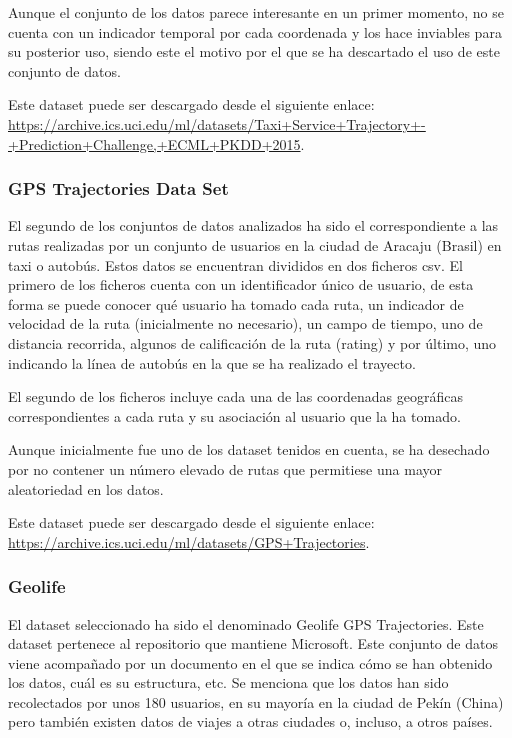 Aunque el conjunto de los datos parece interesante en un primer momento, no se cuenta con un indicador temporal por cada coordenada y los hace inviables para su posterior uso, siendo este el motivo por el que se ha descartado el uso de este conjunto de datos.

Este dataset puede ser descargado desde el siguiente enlace: \url{https://archive.ics.uci.edu/ml/datasets/Taxi+Service+Trajectory+-+Prediction+Challenge,+ECML+PKDD+2015}.

\subsubsection{GPS Trajectories Data Set}
El segundo de los conjuntos de datos analizados ha sido el correspondiente a las rutas realizadas por un conjunto de usuarios en la ciudad de Aracaju (Brasil) en taxi o autobús. Estos datos se encuentran divididos en dos ficheros csv. El primero de los ficheros cuenta con un identificador único de usuario, de esta forma se puede conocer qué usuario ha tomado cada ruta, un indicador de velocidad de la ruta (inicialmente no necesario), un campo de tiempo, uno de distancia recorrida, algunos de calificación de la ruta (rating) y por último, uno indicando la línea de autobús en la que se ha realizado el trayecto.

El segundo de los ficheros incluye cada una de las coordenadas geográficas correspondientes a cada ruta y su asociación al usuario que la ha tomado.

Aunque inicialmente fue uno de los dataset tenidos en cuenta, se ha desechado por no contener un número elevado de rutas que permitiese una mayor aleatoriedad en los datos.

Este dataset puede ser descargado desde el siguiente enlace: \url{https://archive.ics.uci.edu/ml/datasets/GPS+Trajectories}.

\subsubsection{Geolife}
El dataset seleccionado ha sido el denominado Geolife GPS Trajectories. Este dataset pertenece al repositorio que mantiene Microsoft. Este conjunto de datos viene acompañado por un documento en el que se indica cómo se han obtenido los datos, cuál es su estructura, etc. Se menciona que los datos han sido recolectados por unos 180 usuarios, en su mayoría en la ciudad de Pekín (China) pero también existen datos de viajes a otras ciudades o, incluso, a otros países.

